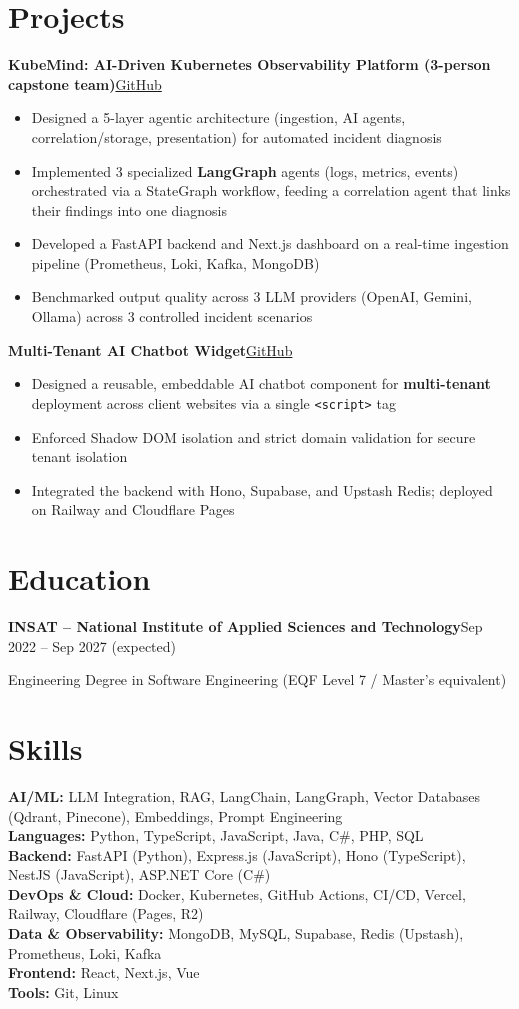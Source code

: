 \documentclass[10pt,a4paper]{article}
\newcommand{\entry}[2]{\vspace{1pt}\noindent\textbf{#1}\hfill{\color{muted}#2}\par}
\newcommand{\gh}[1]{\href{https://github.com/Hsan003/#1}{GitHub}}
\begin{document}
\section{Projects}
\entry{KubeMind: AI-Driven Kubernetes Observability Platform (3-person capstone team)}{\gh{kubemind}}
\begin{itemize}
  \item Designed a 5-layer agentic architecture (ingestion, AI agents, correlation/storage, presentation) for automated incident diagnosis
  \item Implemented 3 specialized \textbf{LangGraph} agents (logs, metrics, events) orchestrated via a StateGraph workflow, feeding a correlation agent that links their findings into one diagnosis
  \item Developed a FastAPI backend and Next.js dashboard on a real-time ingestion pipeline (Prometheus, Loki, Kafka, MongoDB)
  \item Benchmarked output quality across 3 LLM providers (OpenAI, Gemini, Ollama) across 3 controlled incident scenarios
\end{itemize}
\entry{Multi-Tenant AI Chatbot Widget}{\gh{AI-Assistant-Backend}}
\begin{itemize}
  \item Designed a reusable, embeddable AI chatbot component for \textbf{multi-tenant} deployment across client websites via a single \texttt{<script>} tag
  \item Enforced Shadow DOM isolation and strict domain validation for secure tenant isolation
  \item Integrated the backend with Hono, Supabase, and Upstash Redis; deployed on Railway and Cloudflare Pages
\end{itemize}

\section{Education}
\entry{INSAT -- National Institute of Applied Sciences and Technology}{Sep 2022 -- Sep 2027 (expected)}
Engineering Degree in Software Engineering (EQF Level 7 / Master's equivalent)

\section{Skills}
\textbf{AI/ML:} LLM Integration, RAG, LangChain, LangGraph, Vector Databases (Qdrant, Pinecone), Embeddings, Prompt Engineering\\
\textbf{Languages:} Python, TypeScript, JavaScript, Java, C\#, PHP, SQL\\
\textbf{Backend:} FastAPI (Python), Express.js (JavaScript), Hono (TypeScript), NestJS (JavaScript), ASP.NET Core (C\#)\\
\textbf{DevOps \& Cloud:} Docker, Kubernetes, GitHub Actions, CI/CD, Vercel, Railway, Cloudflare (Pages, R2)\\
\textbf{Data \& Observability:} MongoDB, MySQL, Supabase, Redis (Upstash), Prometheus, Loki, Kafka\\
\textbf{Frontend:} React, Next.js, Vue\\
\textbf{Tools:} Git, Linux
\end{document}

